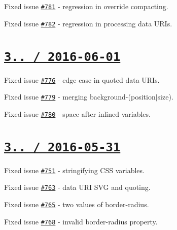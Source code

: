 \begin{DoxyItemize}
\item Fixed issue \href{https://github.com/jakubpawlowicz/clean-css/issues/781}{\tt \#781} -\/ regression in override compacting.
\item Fixed issue \href{https://github.com/jakubpawlowicz/clean-css/issues/782}{\tt \#782} -\/ regression in processing data U\+R\+Is.
\end{DoxyItemize}

\section*{\href{https://github.com/jakubpawlowicz/clean-css/compare/v3.4.14...v3.4.15}{\tt 3.. / 2016-\/06-\/01} }


\begin{DoxyItemize}
\item Fixed issue \href{https://github.com/jakubpawlowicz/clean-css/issues/776}{\tt \#776} -\/ edge case in quoted data U\+R\+Is.
\item Fixed issue \href{https://github.com/jakubpawlowicz/clean-css/issues/779}{\tt \#779} -\/ merging {\ttfamily background-\/(position$\vert$size)}.
\item Fixed issue \href{https://github.com/jakubpawlowicz/clean-css/issues/780}{\tt \#780} -\/ space after inlined variables.
\end{DoxyItemize}

\section*{\href{https://github.com/jakubpawlowicz/clean-css/compare/v3.4.13...v3.4.14}{\tt 3.. / 2016-\/05-\/31} }


\begin{DoxyItemize}
\item Fixed issue \href{https://github.com/jakubpawlowicz/clean-css/issues/751}{\tt \#751} -\/ stringifying C\+SS variables.
\item Fixed issue \href{https://github.com/jakubpawlowicz/clean-css/issues/763}{\tt \#763} -\/ data U\+RI S\+VG and quoting.
\item Fixed issue \href{https://github.com/jakubpawlowicz/clean-css/issues/765}{\tt \#765} -\/ two values of border-\/radius.
\item Fixed issue \href{https://github.com/jakubpawlowicz/clean-css/issues/768}{\tt \#768} -\/ invalid border-\/radius property.
\end{DoxyItemize}

